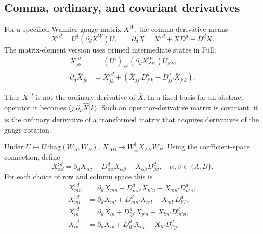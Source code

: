 \documentclass[prx,amsmath,amssymb,superscriptaddress,longbibliography]{revtex4-2}
\begin{document}
\subsection{Comma, ordinary, and covariant derivatives}
\label{sec:derivative-conventions}
For a specified Wannier-gauge matrix $X^W$, the comma derivative means
\begin{equation}
 X^{,d}=U^\dagger(\partial_d X^W)U,\qquad
 \partial_d\bar X=X^{,d}+\bar X D^d-D^d\bar X.
 \label{eq:ordinary-derivative}
\end{equation}
The matrix-element version uses primed intermediate states in Full:
\begin{align}
 X_{jk}^{,d}&=
 (U^\dagger)_{jj'}(\partial_dX_{j'k'}^W)U_{k'k},\nonumber\\
 \partial_d\bar X_{jk}&=X_{jk}^{,d}
 +(\bar X_{jj'}D_{j'k}^d-D_{jj'}^d\bar X_{j'k}).
 \label{eq:ordinary-derivative-components}
\end{align}

Thus $X^{,d}$ is not the ordinary derivative of $\bar X$.
In a fixed basis for an abstract operator it becomes
$\langle j|\partial_d\hat X|k\rangle$.
Such an operator-derivative matrix is covariant; it is the ordinary derivative
of a transformed matrix that acquires derivatives of the gauge rotation.

Under $U\mapsto U\,\mathrm{diag}(W_A,W_B)$,
$X_{AB}\mapsto W_A^\dagger X_{AB}W_B$.
Using the coefficient-space connection, define~\cite{Liu2023CovariantderivativesBerry}
\begin{equation}
 X_{\alpha\beta}^{:d}=\partial_d X_{\alpha\beta}+D_{\alpha\alpha}^d X_{\alpha\beta}-X_{\alpha\beta}D_{\beta\beta}^d,
 \quad \alpha,\beta\in\{A,B\}.
 \label{eq:cov-derivative}
\end{equation}
For each choice of row and column space this is
\begin{align}
 X_{mn}^{:d}&=\partial_dX_{mn}+D_{mn'}^dX_{n'n}-X_{mn'}D_{n'n}^d,\nonumber\\
 X_{ml}^{:d}&=\partial_dX_{ml}+D_{mn'}^dX_{n'l}-X_{ml'}D_{l'l}^d,\nonumber\\
 X_{ln}^{:d}&=\partial_dX_{ln}+D_{lp'}^dX_{p'n}-X_{lm'}D_{m'n}^d,\nonumber\\
 X_{lp}^{:d}&=\partial_dX_{lp}+D_{ll'}^dX_{l'p}-X_{ll'}D_{l'p}^d.
 \label{eq:cov-derivative-components}
\end{align}
\end{document}
